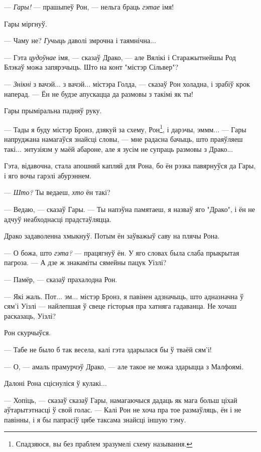 --- \emph{Гары!} --- прашыпеў Рон, --- нельга браць \emph{гэтае} імя!

Гары міргнуў. 

--- Чаму не? \emph{Гучыць} даволі змрочна і таямнічна...

--- Гэта \emph{цудоўнае} імя, --- сказаў Драко, --- але Вялікі і Старажытнейшы
Род Блэкаў можа запярэчыць. Што на конт "містэр Сільвер"?

--- \emph{Знікні} з вачэй... з вачэй... містэра Голда, --- сказаў Рон холадна, 
і зрабіў крок наперад. --- Ён не будзе апускацца да размовы з такімі як ты!

Гары прыміральна падняў руку.

--- Тады я буду містэр Бронз, дзякуй за схему, Рон\footnote{{} Спадзяюся, вы без 
праблем зразумелі схему называння.
}, і дарэчы, эммм... --- 
Гары напруджана намагаўся знайсці словы, --- мне радасна бачыць, што праяўляеш
такі... энтузіязм у маёй абароне, але я зусім не супраць размовы з Драко...

Гэта, відавочна, стала апошняй капляй для Рона, бо ён рэзка павярнуўся да
Гары, і яго вочы гарэлі абурэннем.

--- \emph{Што?} Ты ведаеш, \emph{хто} ён такі?

--- Ведаю, --- сказаў Гары. --- Ты напэўна памятаеш, я назваў яго "Драко", і ён 
не адчуў неабходнасці прадстаўляцца.

Драко задаволенна хмыкнуў. Потым ён заўважыў саву на плячы Рона.

--- О божа, што \emph{гэта?} --- працягнуў ён. У яго словах была слаба прыкрытая
пагроза. --- А дзе ж знакаміты сямейны пацук Уізлі? 

--- Памёр, --- сказаў прахалодна Рон.

--- Які жаль. Пот... эм... містэр Бронз, я павінен адзначыць, што адназначна ў 
сям'і Уізлі --- найлепшая ў свеце гісторыя пра хатняга гадаванца. Не хочаш расказаць,
Уізлі?

Рон скурчыўся. 

--- Табе не было б так весела, калі гэта здарылася бы ў тваёй сям'і!

--- О, --- амаль прамурчэў Драко, --- але такое не можа здарыцца з Малфоямі.

Далоні Рона сціснуліся ў кулакі...

--- Хопіць, --- сказаў сказаў Гары, намагаючыся дадаць як мага больш ціхай
аўтарытэтнасці ў свой голас. --- Калі Рон не хоча пра тое размаўляць, ён і не 
павінны, і я бы папрасіў цябе таксама знайсці іншую тэму.

